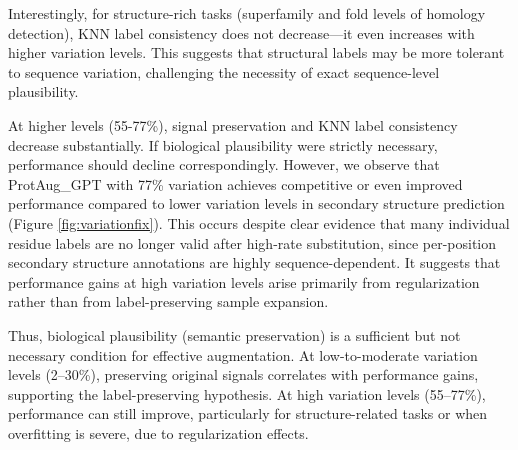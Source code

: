 \documentclass{article}
\begin{document}
Interestingly, for structure-rich tasks (superfamily and fold levels of homology detection), KNN label consistency does not decrease—it even increases with higher variation levels. This suggests that structural labels may be more tolerant to sequence variation, challenging the necessity of exact sequence-level plausibility.

At higher levels (55-77\%), signal preservation and KNN label consistency decrease substantially. If biological plausibility were strictly necessary, performance should decline correspondingly. However, we observe that ProtAug\_GPT with 77\% variation achieves competitive or even improved performance compared to lower variation levels in secondary structure prediction (Figure \ref{fig:variationfix}). This occurs despite clear evidence that many individual residue labels are no longer valid after high-rate substitution, since per-position secondary structure annotations are highly sequence-dependent. It suggests that performance gains at high variation levels arise primarily from regularization rather than from label-preserving sample expansion.

Thus, biological plausibility (semantic preservation) is a sufficient but not necessary condition for effective augmentation. At low-to-moderate variation levels (2–30\%), preserving original signals correlates with performance gains, supporting the label-preserving hypothesis. At high variation levels (55–77\%), performance can still improve, particularly for structure-related tasks or when overfitting is severe, due to regularization effects.


\end{document}
